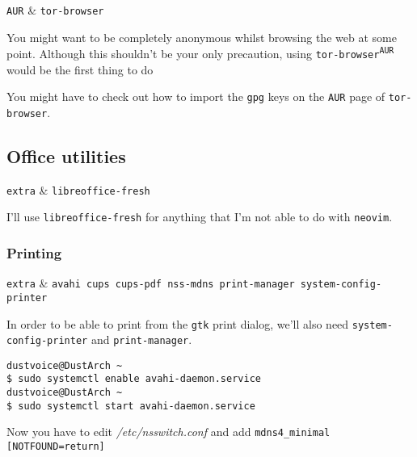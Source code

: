 \documentclass[10pt]{dustdoc}
\begin{document}
\begin{packagetable}
    \texttt{AUR} & \texttt{tor-browser} \\ 
\end{packagetable}

You might want to be completely anonymous whilst browsing the web at some point.
Although this shouldn’t be your only precaution, using \texttt{tor-browser\textsuperscript{\texttt{AUR}}} would be the first thing to do

\begin{NOTE}
    You might have to check out how to import the \texttt{gpg} keys on the \texttt{AUR} page of \texttt{tor-browser}.
\end{NOTE}

\subsection{Office utilities}
\label{sec:office-utilities}

\begin{packagetable}
    \texttt{extra} & \texttt{libreoffice-fresh} \\ 
\end{packagetable}

I’ll use \texttt{libreoffice-fresh} for anything that I’m not able to do with \texttt{neovim}.

\subsubsection{Printing}
\label{sec:printing}

\begin{packagetable}
    \texttt{extra} & \texttt{avahi cups cups-pdf nss-mdns print-manager system-config-printer} \\ 
\end{packagetable}

In order to be able to print from the \texttt{gtk} print dialog, we’ll also need \texttt{system-config-printer} and \texttt{print-manager}.

\begin{verbatim}
dustvoice@DustArch ~
$ sudo systemctl enable avahi-daemon.service
dustvoice@DustArch ~
$ sudo systemctl start avahi-daemon.service
\end{verbatim}

Now you have to edit \textit{/etc/nsswitch.conf} and add\newline
\texttt{mdns4\_minimal [NOTFOUND=return]}
\end{document}

